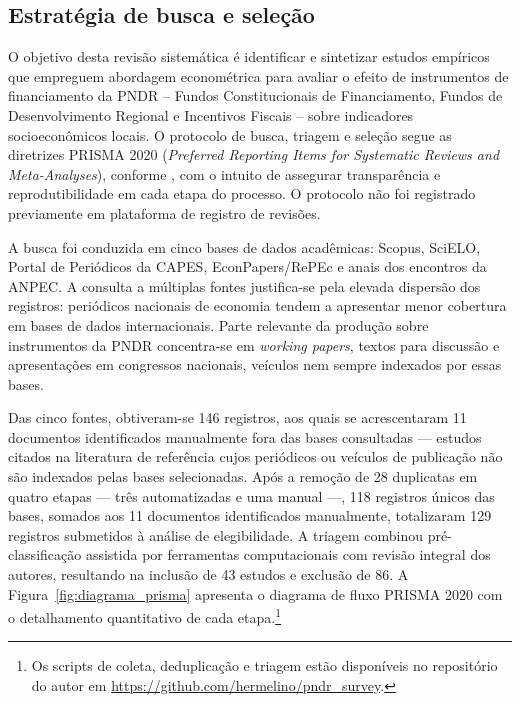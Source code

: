 
\subsection{Estratégia de busca e seleção}
\label{subsec:metodo-estrategia-busca}

O objetivo desta revisão sistemática é identificar e sintetizar estudos empíricos que empreguem abordagem econométrica para avaliar o efeito de instrumentos de financiamento da PNDR -- Fundos Constitucionais de Financiamento, Fundos de Desenvolvimento Regional e Incentivos Fiscais -- sobre indicadores socioeconômicos locais. O protocolo de busca, triagem e seleção segue as diretrizes PRISMA 2020 (\textit{Preferred Reporting Items for Systematic Reviews and Meta-Analyses}), conforme , com o intuito de assegurar transparência e reprodutibilidade em cada etapa do processo. O protocolo não foi registrado previamente em plataforma de registro de revisões.

A busca foi conduzida em cinco bases de dados acadêmicas: Scopus, SciELO, Portal de Periódicos da CAPES, EconPapers/RePEc e anais dos encontros da ANPEC. A consulta a múltiplas fontes justifica-se pela elevada dispersão dos registros: periódicos nacionais de economia tendem a apresentar menor cobertura em bases de dados internacionais. Parte relevante da produção sobre instrumentos da PNDR concentra-se em \textit{working papers}, textos para discussão e apresentações em congressos nacionais, veículos nem sempre indexados por essas bases.

Das cinco fontes, obtiveram-se 146 registros, aos quais se acrescentaram 11 documentos identificados manualmente fora das bases consultadas --- estudos citados na literatura de referência cujos periódicos ou veículos de publicação não são indexados pelas bases selecionadas. Após a remoção de 28 duplicatas em quatro etapas --- três automatizadas e uma manual ---, 118 registros únicos das bases, somados aos 11 documentos identificados manualmente, totalizaram 129 registros submetidos à análise de elegibilidade. A triagem combinou pré-classificação assistida por ferramentas computacionais com revisão integral dos autores, resultando na inclusão de 43 estudos e exclusão de 86. A Figura~\ref{fig:diagrama_prisma} apresenta o diagrama de fluxo PRISMA 2020 com o detalhamento quantitativo de cada etapa.\footnote{Os scripts de coleta, deduplicação e triagem estão disponíveis no repositório do autor em \url{https://github.com/hermelino/pndr_survey}.}

